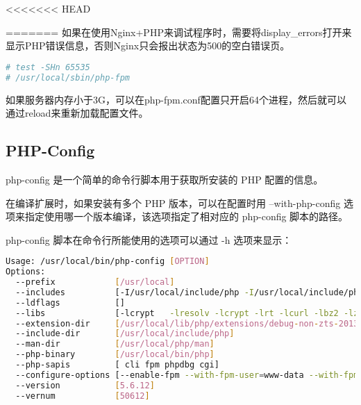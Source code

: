 <<<<<<< HEAD

=======
如果在使用Nginx+PHP来调试程序时，需要将display\_errors打开来显示PHP错误信息，否则Nginx只会报出状态为500的空白错误页。

\begin{lstlisting}[language=bash]
# test -SHn 65535
# /usr/local/sbin/php-fpm
\end{lstlisting}

如果服务器内存小于3G，可以在php-fpm.conf配置只开启64个进程，然后就可以通过reload来重新加载配置文件。

\subsection{PHP-Config}

php-config 是一个简单的命令行脚本用于获取所安装的 PHP 配置的信息。

在编译扩展时，如果安装有多个 PHP 版本，可以在配置时用 --with-php-config 选项来指定使用哪一个版本编译，该选项指定了相对应的 php-config 脚本的路径。

php-config 脚本在命令行所能使用的选项可以通过 -h 选项来显示：


\begin{lstlisting}[language=bash]
Usage: /usr/local/bin/php-config [OPTION]
Options:
  --prefix            [/usr/local]
  --includes          [-I/usr/local/include/php -I/usr/local/include/php/main -I/usr/local/include/php/TSRM -I/usr/local/include/php/Zend -I/usr/local/include/php/ext -I/usr/local/include/php/ext/date/lib]
  --ldflags           []
  --libs              [-lcrypt   -lresolv -lcrypt -lrt -lcurl -lbz2 -lz -lrt -lm -ldl -lnsl  -lxml2 -lz -lm -ldl -lssl -lcrypto -lcurl -lxml2 -lz -lm -ldl -lxml2 -lz -lm -ldl -lcrypt -lxml2 -lz -lm -ldl -lxml2 -lz -lm -ldl -lxml2 -lz -lm -ldl -lssl -lcrypto -lcrypt ]
  --extension-dir     [/usr/local/lib/php/extensions/debug-non-zts-20131226]
  --include-dir       [/usr/local/include/php]
  --man-dir           [/usr/local/php/man]
  --php-binary        [/usr/local/bin/php]
  --php-sapis         [ cli fpm phpdbg cgi]
  --configure-options [--enable-fpm --with-fpm-user=www-data --with-fpm-group=www-data --enable-phpdbg --enable-phpdbg-debug --enable-debug --with-openssl --with-zlib --with-bz2 --with-curl --enable-mbstring --enable-pdo --with-pdo-mysql --with-pear]
  --version           [5.6.12]
  --vernum            [50612]
\end{lstlisting}


